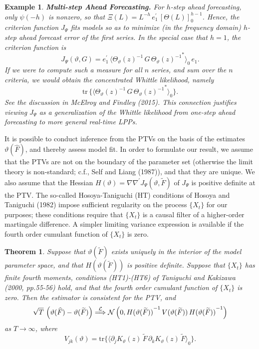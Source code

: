 \documentclass[a4paper]{book}
\def\convinlaw{\stackrel{{\cal L}}{\Longrightarrow }}
\def\tends{\rightarrow}
\newtheorem{Theorem}{Theorem}
\newtheorem{Example}{Example}
\begin{document}
\begin{Example} {\bf Multi-step Ahead Forecasting.}  \rm
\label{exam:multi-step.fore.3}
 For $h$-step ahead forecasting, only $\psi (-h)$
  is nonzero, so that
 $\Xi (L) =  L^{-h} \,  e_1^{\prime} \, {[ \Theta (L) ]}_0^{ h - 1}$. 
  Hence, the criterion function $J_{\Psi} $ fits models so as to minimize
 (in the frequency domain)  $h$-step ahead forecast error of the first series. 
 In the special case that $h=1$, the criterion function is
\[
 J_{\Psi} (\vartheta, G) =  e_1^{\prime} \, { \langle   { \Theta_{\vartheta   } (z) }^{-1}  \,
  G \, { { \Theta_{\vartheta  } (z) }^{-1} }^*  \rangle }_0 \, e_1.
\]
   If we were to compute such a measure for all $n$ series, and sum over the $n$ criteria, we would obtain the concentrated Whittle 
 likelihood, namely
\[
  \mbox{tr} \, \{  { \langle   { \Theta_{\vartheta   } (z) }^{-1}  \, G \,
  { { \Theta_{\vartheta  } (z) }^{-1} }^*  \rangle }_0 \}.
\]
  See the discussion in McElroy and Findley (2015).  This connection justifies viewing $J_{\Psi}$ as a generalization of the Whittle
 likelihood from one-step ahead forecasting to more general real-time LPPs.
\end{Example}



It is possible to conduct inference from the PTVs on the basis of the estimates 
$\vartheta (\widehat{F})$, and thereby assess model fit.  
 In order to formulate our result, we assume that the PTVs are not on the
 boundary of the parameter set (otherwise the limit theory
 is non-standard; c.f., Self and Liang (1987)), and  that they are unique. 
We also assume that the  Hessian  $H(\vartheta) = \nabla \nabla^{\prime}
  J_{\Psi} (\vartheta, \widetilde{F}) $  of $J_{\Psi} $ is positive definite at the PTV.
  The so-called Hosoya-Taniguchi (HT) conditions of Hosoya and Taniguchi (1982) 
impose sufficient regularity   on the process
 $\{ X_t \}$ for our purposes; these conditions require that $\{ X_t \}$ is a 
causal filter of a higher-order martingale difference.  
 A simpler limiting variance expression is available if the fourth order cumulant
 function of $\{ X_t \}$ is zero.  

\begin{Theorem}
\label{thm:LPP-Clt}
 Suppose that $\vartheta (\widetilde{F}) $ exists uniquely in the interior of the model 
 parameter space,   and that $H(\vartheta (\widetilde{F}))$ is 
 positive definite.  Suppose that $\{ X_t \}$ has finite fourth moments, conditions (HT1)-(HT6) of Taniguchi and Kakizawa (2000, pp.55-56)
 hold, and that the fourth order cumulant function of $\{ X_t \}$ is zero.  Then the estimator is consistent for the PTV, and
\[
 \sqrt{T} \, \left( \vartheta( \widehat{F} ) - \vartheta (\widetilde{F}) \right) 
 \convinlaw \mathcal{N} \left( 0, { H(\vartheta (\widetilde{F})) }^{-1} \, V (\vartheta (\widetilde{F})) \, { H(\vartheta (\widetilde{F})) }^{-1} \right)
\]
 as $T \tends \infty$, where 
\[
  V_{jk} (\vartheta) =  \mbox{tr} \{ { \langle  \partial_j K_{\vartheta} (z) \, \widetilde{F} \, \partial_k K_{\vartheta} (z) \, \widetilde{F} \rangle }_0 \}.
\]
\end{Theorem}
\end{document}
